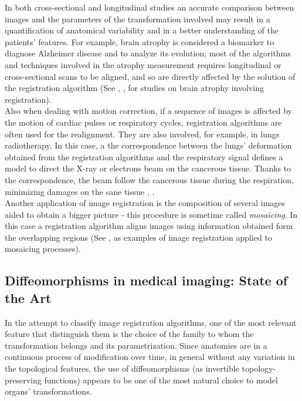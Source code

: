 In both cross-sectional and longitudinal studies an accurate comparison between images and the parameters of the transformation involved may result in a quantification of anatomical variability and in a better understanding of the patients' features. 
%
For example, brain atrophy is considered a biomarker to diagnose Alzheimer disease and to analyze its evolution; most of the algorithms and techniques involved in the atrophy measurement requires longitudinal or cross-sectional scans to be aligned, and so are directly affected by the solution of the registration algorithm (See \cite{prados2015measuring} \cite{fox1997brain}, \cite{gauthier2012prevention}, for studies on brain atrophy involving registration). \\

Also when dealing with motion correction, if a sequence of images is affected by the motion of cardiac pulses or respiratory cycles, registration algorithms are often used for the realignment. 
They are also involved, for example, in lungs radiotherapy. In this case, a the correspondence between the lungs' deformation obtained from the registration algorithms and the respiratory signal defines a model to direct the X-ray or electrons beam on the cancerous tissue. Thanks to the correspondence, the beam follow the cancerous tissue during the respiration, minimizing damages on the sane tissue \cite{mcclelland}, \cite{mcclelland2011inter}.\\

Another application of image registration is the composition of several images aided to obtain a bigger picture - this procedure is sometime called \emph{mosaicing}. In this case a registration algorithm aligns images using information obtained form the overlapping regions (See \cite{vercauteren2006robust}, \cite{szeliski1994image} as examples of image registration applied to mosaicing processes).

\subsection{Diffeomorphisms in medical imaging: State of the Art}

In the attempt to classify image registration algorithms, one of the most relevant feature that distinguish them is the choice of the family to whom the transformation belongs and its parametrization. Since anatomies are in a continuous process of modification over time, in general without any variation in the topological features, the use of diffeomorphisms (as invertible topology-preserving functions) appears to be one of the most natural choice to model organs' transformations.\\

